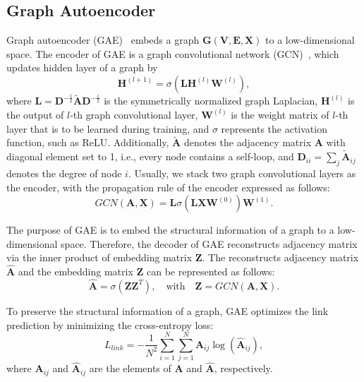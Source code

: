 \documentclass{article}
\begin{document}
\subsection{Graph Autoencoder}
Graph autoencoder (GAE)~\citep{kipf2016variational} embeds a graph $\mathbf{G}(\mathbf{V},\mathbf{E},\mathbf{X})$ to a low-dimensional space. The encoder of GAE is a graph convolutional network (GCN)~\citep{kipf2016semi}, which updates hidden layer of a graph by
\begin{equation}
\mathbf{H}^{(l+1)} = \sigma(\mathbf{L}\mathbf{H}^{(l)}\mathbf{W}^{(l)}),
\end{equation}
where $\mathbf{L}=\mathbf{D}^{-\frac{1}{2}}\mathbf{\widetilde{A}}\mathbf{D}^{-\frac{1}{2}}$ is the symmetrically normalized graph Laplacian, $\mathbf{H}^{(l)}$ is the output of $l$-th graph convolutional layer, $\mathbf{W}^{(l)}$ is the weight matrix of $l$-th layer that is to be learned during training, and $\sigma$ represents the activation function, such as ReLU. Additionally, $\mathbf{\widetilde{A}}$ denotes the adjacency matrix $\mathbf{A}$ with diagonal element set to 1, i.e., every node contains a self-loop, and $\mathbf{D}_{ii}=\sum_j \mathbf{\widetilde{A}}_{ij} $ denotes the degree of node $i$. Usually, we stack two graph convolutional layers as the encoder, with the propagation rule of the encoder expressed as follows:
\begin{equation}
 GCN(\mathbf{A},\mathbf{X}) = \mathbf{L}\sigma(\mathbf{L}\mathbf{X}\mathbf{W}^{(0)})\mathbf{W}^{(1)}.
\label{Eq:GCN}
\end{equation}

The purpose of GAE is to embed the structural information of a graph to a low-dimensional space. Therefore, the decoder of GAE reconstructs adjacency matrix via the inner product of embedding matrix $\mathbf{Z}$.
The reconstructs adjacency matrix $\mathbf{\hat{A}}$ and the embedding matrix $\mathbf{Z}$ can be represented as follows:
\begin{equation}
\mathbf{\hat{A}} =\sigma(\mathbf{ZZ}^T),  \quad \text{with} \quad   \mathbf{Z}=GCN(\mathbf{A},\mathbf{X}).
\label{Eq:innerP}
\end{equation}

To preserve the structural information of a graph, GAE optimizes the link prediction by minimizing the cross-entropy loss:
\begin{equation}
L_{link} = -\frac{1}{N^2}\sum_{i=1}^N \sum_{j=1}^N  \mathbf{A}_{ij} \log(\mathbf{\hat{A}}_{ij}),
\label{Eq:LossLink}
\end{equation}
where $\mathbf{A}_{ij}$ and $\mathbf{\hat{A}}_{ij}$ are the elements of  $\mathbf{A}$ and $\mathbf{\hat{A}}$, respectively.
\end{document}
